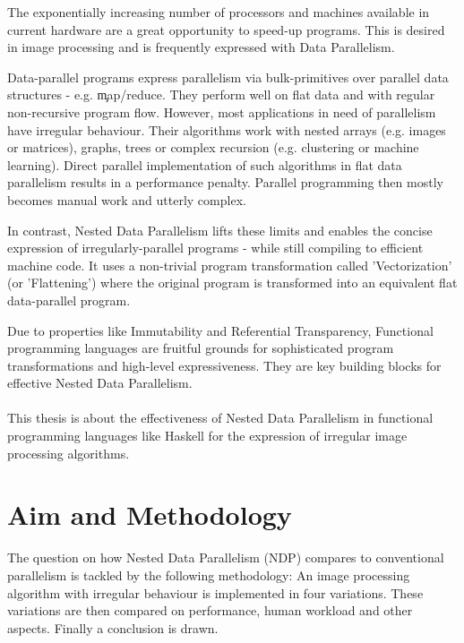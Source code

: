 

The exponentially increasing number of processors and machines
available in current hardware are a great
opportunity to speed-up programs.
This is desired in image processing
and is frequently expressed with Data Parallelism.

Data-parallel programs express parallelism
via bulk-primitives over parallel data structures - e.g. \c{map/reduce}.
They perform well on flat data and with regular
non-recursive program flow.
However, most applications in need of parallelism
have irregular behaviour. Their
algorithms work with nested
arrays (e.g. images or matrices),
graphs, trees or complex recursion (e.g. clustering or machine learning).
Direct parallel implementation of such algorithms
in flat data parallelism results in
a performance penalty.
Parallel programming then mostly becomes manual work and utterly complex.

In contrast, Nested Data Parallelism \cite{Belloch1996} lifts these limits
and enables the concise expression of irregularly-parallel programs
- while still compiling to efficient machine code.
It uses a non-trivial program transformation called 'Vectorization'
(or 'Flattening') where the original program is transformed
into an equivalent flat data-parallel program.

Due to properties like Immutability and Referential Transparency,
Functional programming languages are fruitful grounds for
sophisticated program transformations
and high-level expressiveness. They are key building
blocks for effective Nested Data Parallelism.

\paragraph{}
This thesis is about the effectiveness of Nested Data Parallelism
in functional programming languages like Haskell for the
expression of irregular image processing algorithms.


\section{Aim and Methodology}
  The question on how Nested Data Parallelism (NDP) compares to
  conventional parallelism is tackled by the following methodology:
  An image processing algorithm with irregular behaviour
  is implemented in four variations. These variations are
  then compared on performance, human workload and other aspects.
  Finally a conclusion is drawn.
  
